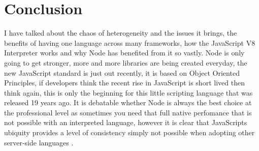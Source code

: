 \documentclass[12pt]{article} %
\begin{document}







\section{Conclusion} %
I have talked about the chaos of heterogeneity and the issues it brings, the benefits of having one language across many frameworks, how the JavaScript V8 Interpreter works and why Node has benefited from it so vastly.
Node is only going to get stronger, more and more libraries are being created everyday, the new JavaScript standard is just out recently, it is based on Object Oriented Principles, if developers think the recent rise in JavaScript is short lived then think again, this is only the beginning for this little scripting language that was released 19 years ago.
It is debatable whether Node is always the best choice at the professional level as sometimes you need that full native perfomance that is not possible with an interpreted language, however it is clear that JavaScripts ubiquity provides a level of consistency simply not possible when adopting other server-side languages \cite{1}.
\end{document}
